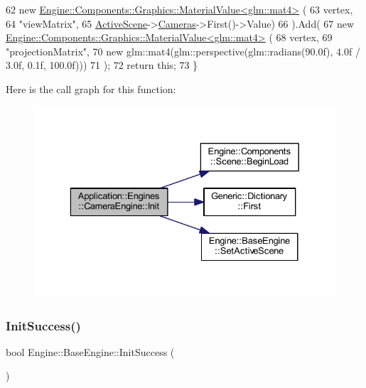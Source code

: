 \begin{DoxyCode}
62             \textcolor{keyword}{new} \mbox{\hyperlink{classEngine_1_1Components_1_1Graphics_1_1MaterialValue}{Engine::Components::Graphics::MaterialValue<glm::mat4>}}
      (
63                 vertex,
64                 \textcolor{stringliteral}{"viewMatrix"},
65                 \mbox{\hyperlink{classEngine_1_1BaseEngine_adb3dbc839da9d821e08b18d8a221698d}{ActiveScene}}->\mbox{\hyperlink{classEngine_1_1Components_1_1Scene_aea98ff1ced88ee859878b504e9a2a362}{Cameras}}->First()->Value)
66         ).Add(
67             \textcolor{keyword}{new} \mbox{\hyperlink{classEngine_1_1Components_1_1Graphics_1_1MaterialValue}{Engine::Components::Graphics::MaterialValue<glm::mat4>}}
      (
68                 vertex,
69                 \textcolor{stringliteral}{"projectionMatrix"},
70                 \textcolor{keyword}{new} glm::mat4(glm::perspective(glm::radians(90.0f), 4.0f / 3.0f, 0.1f, 100.0f)))
71         );
72     \textcolor{keywordflow}{return} \textcolor{keyword}{this};
73 \}
\end{DoxyCode}
Here is the call graph for this function\+:
\nopagebreak
\begin{figure}[H]
\begin{center}
\leavevmode
\includegraphics[width=329pt]{classApplication_1_1Engines_1_1CameraEngine_a0c7723b93afbdef70394961a4624813d_cgraph}
\end{center}
\end{figure}
\mbox{\label{classEngine_1_1BaseEngine_a7a1c9b833049b3eb61194cab113dfe89}} 
\subsubsection{\texorpdfstring{Init\+Success()}{InitSuccess()}}
{\footnotesize\ttfamily bool Engine\+::\+Base\+Engine\+::\+Init\+Success (\begin{DoxyParamCaption}{ }\end{DoxyParamCaption})\hspace{0.3cm}{\ttfamily [inherited]}}



